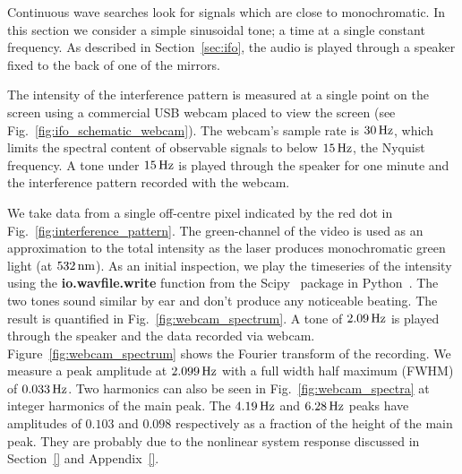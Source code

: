 \documentclass[paper-main.tex]{subfiles}
\begin{document}

Continuous wave searches look for signals which are close to monochromatic. 
In this section we consider a simple sinusoidal tone; a time at a single constant frequency. 
As described in Section~\ref{sec:ifo}, the audio is played through a speaker fixed to the back of one of the mirrors.


The intensity of the interference pattern is measured at a single point on the screen using a commercial USB webcam placed to view the screen (see Fig.~\ref{fig:ifo_schematic_webcam}). 
The webcam's sample rate is $30\,{\rm Hz}$, which limits the spectral content of observable signals to below $15\,{\rm Hz}$, the Nyquist frequency.
A tone under $15\,{\rm Hz}$ is played through the speaker for one minute and the interference pattern recorded with the webcam. 


We take data from a single off-centre pixel indicated by the red dot in Fig.~\ref{fig:interference_pattern}. 
The green-channel of the video is used as an approximation to the total intensity as the laser produces monochromatic green light (at $532\,{\rm nm}$).
As an initial inspection, we play the timeseries of the intensity using the \textbf{io.wavfile.write} function from the Scipy~\cite{scipy} package in Python~\cite{python}. 
The two tones sound similar by ear and don't produce any noticeable beating. 
The result is quantified in Fig.~\ref{fig:webcam_spectrum}. 
A tone of $2.09\,{\rm Hz}$ is played through the speaker and the data recorded via webcam. 
Figure~\ref{fig:webcam_spectrum} shows the Fourier transform of the recording.
We measure a peak amplitude at $2.099\,{\rm Hz}$ with a full width half maximum (FWHM) of $0.033\,{\rm Hz}$. 
Two harmonics can also be seen in Fig.~\ref{fig:webcam_spectra} at integer harmonics of the main peak. 
The $4.19\,{\rm Hz}$ and $6.28\,{\rm Hz}$ peaks have amplitudes of $0.103$ and $0.098$ respectively as a fraction of the height of the main peak. 
They are probably due to the nonlinear system response discussed in Section~\ref{} and Appendix~\ref{}. 
\end{document}
